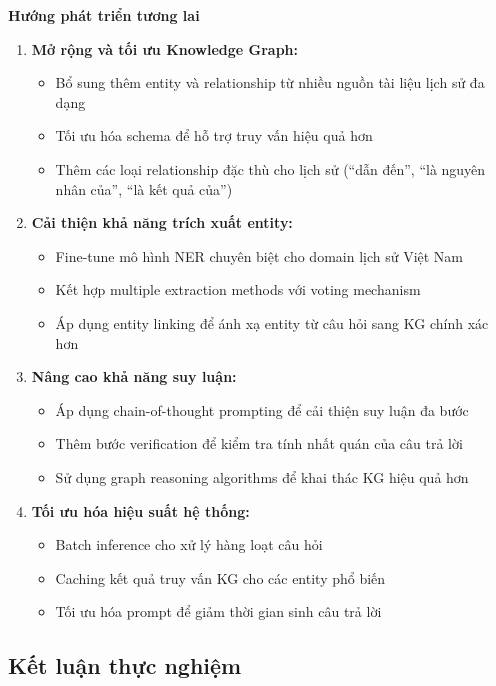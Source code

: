 \textbf{Hướng phát triển tương lai}
\begin{enumerate}
    \item \textbf{Mở rộng và tối ưu Knowledge Graph:}
    \begin{itemize}
        \item Bổ sung thêm entity và relationship từ nhiều nguồn tài liệu lịch sử đa dạng
        \item Tối ưu hóa schema để hỗ trợ truy vấn hiệu quả hơn
        \item Thêm các loại relationship đặc thù cho lịch sử (``dẫn đến'', ``là nguyên nhân của'', ``là kết quả của'')
    \end{itemize}
    
    \item \textbf{Cải thiện khả năng trích xuất entity:}
    \begin{itemize}
        \item Fine-tune mô hình NER chuyên biệt cho domain lịch sử Việt Nam
        \item Kết hợp multiple extraction methods với voting mechanism
        \item Áp dụng entity linking để ánh xạ entity từ câu hỏi sang KG chính xác hơn
    \end{itemize}
    
    \item \textbf{Nâng cao khả năng suy luận:}
    \begin{itemize}
        \item Áp dụng chain-of-thought prompting để cải thiện suy luận đa bước
        \item Thêm bước verification để kiểm tra tính nhất quán của câu trả lời
        \item Sử dụng graph reasoning algorithms để khai thác KG hiệu quả hơn
    \end{itemize}
    
    \item \textbf{Tối ưu hóa hiệu suất hệ thống:}
    \begin{itemize}
        \item Batch inference cho xử lý hàng loạt câu hỏi
        \item Caching kết quả truy vấn KG cho các entity phổ biến
        \item Tối ưu hóa prompt để giảm thời gian sinh câu trả lời
    \end{itemize}
\end{enumerate}

\subsection{Kết luận thực nghiệm}


